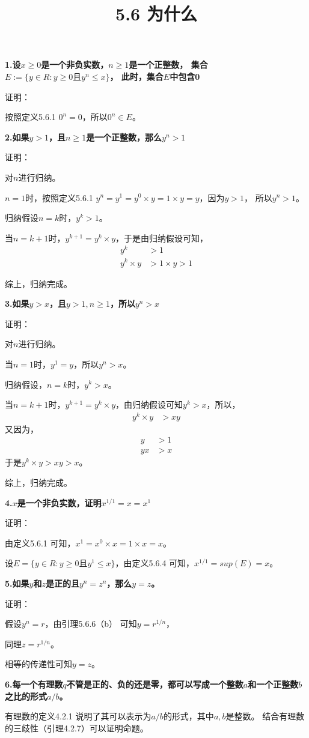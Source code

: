 \documentclass{article}
\theoremstyle{mystyle}
\begin{document}
\title{5.6 为什么}
\maketitle


\textbf{1.设$x \geq 0$是一个非负实数，$n \geq 1$是一个正整数，
  集合$E:=\{y \in R : y \geq 0 \text{且} y^n \leq x\}$，
  此时，集合$E$中包含0}

证明：

按照定义5.6.1 $0^n = 0$，所以$0^n \in E$。

\textbf{2.如果$y > 1$，且$n \geq 1$是一个正整数，那么$y^n > 1$}

证明：

对$n$进行归纳。

$n = 1$时，按照定义5.6.1 $y^n=y^1=y^0 \times y = 1 \times y = y$，因为$y > 1$，
所以$y^n > 1$。

归纳假设$n = k$时，$y^k > 1$。

当$n = k+1$时，$y^{k+1} = y^k \times y$，于是由归纳假设可知，
\begin{align*}
  y^k          & > 1              \\
  y^k \times y & > 1 \times y > 1
\end{align*}

综上，归纳完成。

\textbf{3.如果$y > x$，且$y > 1, n \geq 1$，所以$y^n > x$}

证明：

对$n$进行归纳。

当$n=1$时，$y^1 = y$，所以$y^n > x$。

归纳假设，$n=k$时，$y^k > x$。

当$n = k+1$时，$y^{k+1} = y^k \times y$，由归纳假设可知$y^k > x$，所以，
\begin{align*}
  y^k \times y & > xy
\end{align*}
又因为，
\begin{align*}
  y  & > 1 \\
  yx & > x
\end{align*}
于是$y^k \times y > xy > x$。

综上，归纳完成。

\textbf{4.$x$是一个非负实数，证明$x^{1/1}=x=x^1$}

证明：

由定义5.6.1 可知，$x^1 = x^0 \times x = 1 \times x = x$。

设$E=\{y \in R: y \geq 0 \text{且} y^1 \leq x\}$，由定义5.6.4 可知，$x^{1/1} = sup(E) = x$。

\textbf{5.如果$y$和$z$是正的且$y^n=z^n$，那么$y=z$。}

证明：

假设$y^n = r$，由引理5.6.6（b） 可知$y = r^{1/n}$，

同理$z = r^{1/n}$。

相等的传递性可知$y=z$。

\textbf{6.每一个有理数$q$不管是正的、负的还是零，都可以写成一个整数$a$和一个正整数$b$之比的形式$a/b$。}

有理数的定义4.2.1 说明了其可以表示为$a/b$的形式，其中$a,b$是整数。
结合有理数的三歧性（引理4.2.7）可以证明命题。
\end{document}
